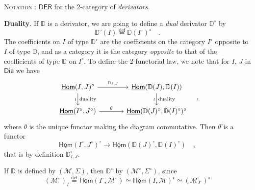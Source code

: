 \documentclass[11pt]{article}
\newcommand{\msp}[1]{\marginpar{\footnotesize [#1]}}
\newcommand{\DD}{\mathbb{D}}
\newcommand{\uHom}{\underline{\mathsf{Hom}}}
\newcommand{\Dia}{\mathsf{Dia}}
\newcommand{\defeq}{\overset{\text{def}}{=}}
\begin{document}
\noindent\textsc{Notation} : $\mathsf{DER}$ for the 2-category of \textit{derivators.}

\noindent\msp{page 17}\textbf{Duality}. If $\DD$ is a derivator, we are going to define a \textit{dual} derivator $\DD^\circ$ by
\[
\DD^\circ(I) \defeq \DD(I^\circ)^\circ \quad .
\]
The coefficients on $I$ of type $\DD^\circ$ are the coefficients on the category $I^\circ$ opposite to $I$ of type $\DD$, and as a category it is the category \textit{opposite} to that of the coefficients of type $\DD$ on $I^\circ$. To define the 2-functorial law, we note that for $I$, $J$ in $\Dia$ we have %
\[
\begin{tikzcd}[column sep=large]
\uHom(I,J)^\circ \arrow[r, "\DD_{I,J}"] \arrow[d, "\wr"', "\text{duality}"] & \uHom(\DD(J),\DD(I)) \arrow[d, "\wr"', "\text{duality}"] \\
\uHom(I^\circ,J^\circ) \arrow[r, "\theta"] & \uHom(\DD(J)^\circ,\DD(I)^\circ)^\circ
\end{tikzcd}
\quad ,
\]
where $\theta$ is the unique functor making the diagram commutative. Then $\theta^\circ$is a functor
\[
\uHom(I^\circ,J^\circ)^\circ \longrightarrow \uHom(\DD(J)^\circ,\DD(I)^\circ) \quad ,
\]
that is by definition $\DD^\circ_{I,J}$.

If $\DD$ is defined by $(\mathcal{M},\Sigma)$, then $\DD^\circ$ by $(\mathcal{M}^\circ,\Sigma^\circ)$, since
\[
(\mathcal{M}^\circ)_I \defeq \uHom(I^\circ,\mathcal{M}^\circ) \simeq \uHom(I,\mathcal{M})^\circ \simeq (\mathcal{M}_{I^\circ})^\circ
\]
\end{document}

